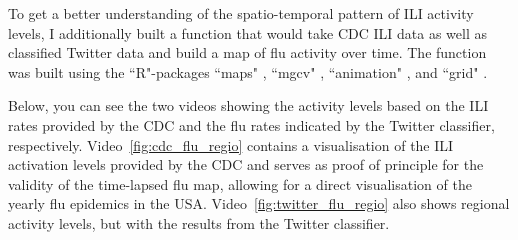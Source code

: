 \documentclass[11pt, a4paper,twoside]{report}\usepackage[]{graphicx}\usepackage[]{color}
\begin{document}
To get a better understanding of the spatio-temporal pattern of ILI activity levels, I additionally built a function that would take CDC ILI data as well as classified Twitter data and build a map of flu activity over time. The function was built using the ``R"-packages ``maps" \citep{maps_2016}, ``mgcv" \citep{mgcv_2006,mgcv_2016}, ``animation" \citep{animation_2015}, and ``grid" \citep{rbase_2017}. 

Below, you can see the two videos showing the activity levels based on the ILI rates provided by the CDC and the flu rates indicated by the Twitter classifier, respectively. Video~\ref{fig:cdc_flu_regio} contains a visualisation of the ILI activation levels provided by the CDC and serves as proof of principle for the validity of the time-lapsed flu map, allowing for a direct visualisation of the yearly flu epidemics in the USA. Video~\ref{fig:twitter_flu_regio} also shows regional activity levels, but with the results from the Twitter classifier. 
\end{document}
